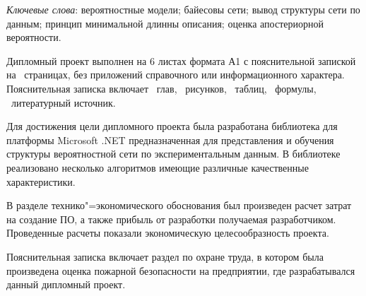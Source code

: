\thispagestyle{empty}

\emph{Ключевые слова}: вероятностные модели; байесовы сети; вывод структуры сети по данным; принцип минимальной длинны описания; оценка апостериорной вероятности.

\vspace{4\parsep}

Дипломный проект выполнен на 6 листах формата А1 с пояснительной запиской на~\pageref*{LastPage} страницах, без приложений справочного или информационного характера. 
Пояснительная записка включает ~глав, \totfig{}~рисунков, \tottab{}~таблиц, \toteq{}~формулы, \totref{}~литературный источник.

Для достижения цели дипломного проекта была разработана библиотека для платформы Microsoft .NET предназначенная для представления и обучения структуры вероятностной сети по экспериментальным данным.
В библиотеке реализовано несколько алгоритмов имеющие различные качественные характеристики.

В разделе технико"=экономического обоснования был произведен расчет затрат на создание ПО, а также прибыль от разработки получаемая разработчиком.
Проведенные расчеты показали экономическую целесообразность проекта.

Пояснительная записка включает раздел по охране труда, в котором была произведена оценка пожарной безопасности на предприятии, где разрабатывался данный дипломный проект.

\clearpage